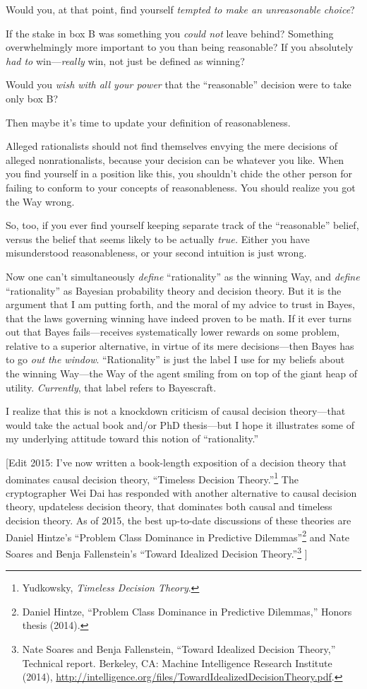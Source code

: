 {
 Would you, at that point, find yourself \textit{tempted to make an
unreasonable choice}?}

{
 If the stake in box B was something you \textit{could not} leave
behind? Something overwhelmingly more important to you than being
reasonable? If you absolutely \textit{had to} win---\textit{really}
win, not just be defined as winning?}

{
 Would you \textit{wish with all your power} that the
``reasonable'' decision were to take
only box B?}

{
 Then maybe it's time to update your definition of
reasonableness.}

{
 Alleged rationalists should not find themselves envying the mere
decisions of alleged nonrationalists, because your decision can be
whatever you like. When you find yourself in a position like this, you
shouldn't chide the other person for failing to conform
to your concepts of reasonableness. You should realize you got the Way
wrong.}

{
 So, too, if you ever find yourself keeping separate track of the
``reasonable'' belief, versus the
belief that seems likely to be actually \textit{true.} Either you have
misunderstood reasonableness, or your second intuition is just wrong.}

{
 Now one can't simultaneously \textit{define}
``rationality'' as the winning Way,
and \textit{define} ``rationality''
as Bayesian probability theory and decision theory. But it is the
argument that I am putting forth, and the moral of my advice to trust
in Bayes, that the laws governing winning have indeed proven to be
math. If it ever turns out that Bayes fails---receives systematically
lower rewards on some problem, relative to a superior alternative, in
virtue of its mere decisions---then Bayes has to go \textit{out the
window}. ``Rationality'' is just the
label I use for my beliefs about the winning Way---the Way of the agent
smiling from on top of the giant heap of utility. \textit{Currently},
that label refers to Bayescraft.}

{
 I realize that this is not a knockdown criticism of causal
decision theory---that would take the actual book and/or PhD
thesis---but I hope it illustrates some of my underlying attitude
toward this notion of
``rationality.''}

{
 [Edit 2015: I've now written a book-length
exposition of a decision theory that dominates causal decision theory,
``Timeless Decision
Theory.''\footnote{Yudkowsky, \textit{Timeless Decision Theory}.} The cryptographer Wei
Dai has responded with another alternative to causal decision theory,
updateless decision theory, that dominates both causal and timeless
decision theory. As of 2015, the best up-to-date discussions of these
theories are Daniel Hintze's ``Problem
Class Dominance in Predictive
Dilemmas''\footnote{Daniel Hintze, ``Problem Class Dominance in
Predictive Dilemmas,'' Honors thesis (2014).} and Nate Soares and
Benja Fallenstein's ``Toward Idealized
Decision Theory.''\footnote{Nate Soares and Benja Fallenstein, ``Toward
Idealized Decision Theory,'' Technical report.
Berkeley, CA: Machine Intelligence Research Institute (2014),
\url{http://intelligence.org/files/TowardIdealizedDecisionTheory.pdf}.} ]}

